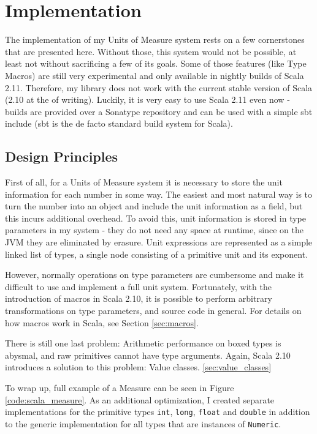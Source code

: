 \documentclass[12pt,oneside,a4paper]{scrbook}
\begin{document}
\chapter{Implementation}

The implementation of my Units of Measure system rests on a few cornerstones that are presented here. Without those, this system would not be possible, at least not without sacrificing a few of its goals. Some of those features (like Type Macros) are still very experimental and only available in nightly builds of Scala 2.11. Therefore, my library does not work with the current stable version of Scala (2.10 at the of writing). Luckily, it is very easy to use Scala 2.11 even now - builds are provided over a Sonatype repository and can be used with a simple sbt include (sbt is the de facto standard build system for Scala).

\section{Design Principles}
First of all, for a Units of Measure system it is necessary to store the unit information for each number in some way. The easiest and most natural way is to turn the number into an object and include the unit information as a field, but this incurs additional overhead. To avoid this, unit information is stored in type parameters in my system - they do not need any space at runtime, since on the JVM they are eliminated by erasure. Unit expressions are represented as a simple linked list of types, a single node consisting of a primitive unit and its exponent.

However, normally operations on type parameters are cumbersome and make it difficult to use and implement a full unit system. Fortunately, with the introduction of macros in Scala 2.10, it is possible to perform arbitrary transformations on type parameters, and source code in general. For details on how macros work in Scala, see Section \ref{sec:macros}.

There is still one last problem: Arithmetic performance on boxed types is abysmal, and raw primitives cannot have type arguments. Again, Scala 2.10 introduces a solution to this problem: Value classes. \ref{sec:value_classes}

To wrap up, full example of a Measure can be seen in Figure \ref{code:scala_measure}. As an additional optimization, I created separate implementations for the primitive types \verb|int|, \verb|long|, \verb|float| and \verb|double| in addition to the generic implementation for all types that are instances of \verb|Numeric|.
\end{document}
